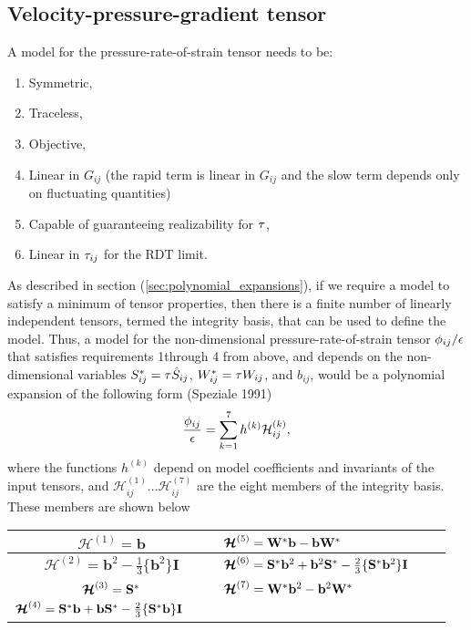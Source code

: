 \documentclass[oneside,a4paper,11pt]{report}
\begin{document}
\subsection{Velocity-pressure-gradient tensor}

A model for the pressure-rate-of-strain tensor needs to be:
\begin{enumerate}
\item Symmetric,
\item Traceless,
\item Objective,
\item Linear in $G_{ij}$ (the rapid term is linear in $G_{ij}$ and the slow term depends only on fluctuating quantities)
\item Capable of guaranteeing realizability for $\tau$,
\item Linear in $\tau_{ij}$ for the RDT limit.
\end{enumerate}
As described in section (\ref{sec:polynomial_expansions}), if we require a model to satisfy a minimum of tensor properties, then there is a finite number of linearly independent tensors, termed the integrity basis, that can be used to define the model. Thus, a model for the non-dimensional pressure-rate-of-strain tensor $\phi_{ij}/\epsilon$ that satisfies requirements 1through 4 from above, and depends on the non-dimensional variables $S^*_{ij} = \tau \hat{S}_{ij}$, $W^*_{ij} = \tau W_{ij}$, and $b_{ij}$, would be a polynomial expansion of the following form (Speziale 1991)
\begin{equation}
\frac{\phi_{ij}}{\epsilon} = \sum_{k=1}^7 h^{(k)} \mathcal{H}^{(k)}_{ij},
\end{equation}
where the functions $h^{(k)}$ depend on model coefficients and invariants of the input tensors, and $\mathcal{H}^{(1)}_{ij} ... \mathcal{H}^{(7)}_{ij}$ are the eight members of the integrity basis. These members are shown below
\begin{center}
\begin{tabular} {| Sl | Sl | }
\hline
$\boldsymbol{\mathcal{H}}^{(1)} = \mathbf{b}$ & $\boldsymbol{\mathcal{H}}^{(5)} = \mathbf{W^*} \mathbf{b} - \mathbf{b} \mathbf{W^*}$ \\
\hline
$\boldsymbol{\mathcal{H}}^{(2)} = \mathbf{b}^2 - \frac{1}{3} \{ \mathbf{b}^2 \} \mathbf{I}$ & $\boldsymbol{\mathcal{H}}^{(6)} = \mathbf{S^*} \mathbf{b}^2 + \mathbf{b}^2 \mathbf{S^*} - \frac{2}{3} \{ \mathbf{S^*} \mathbf{b}^2 \} \mathbf{I}$ \\
\hline
$\boldsymbol{\mathcal{H}}^{(3)} = \mathbf{S^*} $ & $ \boldsymbol{\mathcal{H}}^{(7)} = \mathbf{W^*} \mathbf{b}^2 - \mathbf{b}^2 \mathbf{W^*} $ \\
\hline
$ \boldsymbol{\mathcal{H}}^{(4)} = \mathbf{S^*} \mathbf{b} + \mathbf{b} \mathbf{S^*} - \frac{2}{3} \{ \mathbf{S^*} \mathbf{b} \} \mathbf{I}  \qquad$ & \\
\hline
\end{tabular}
\end{center}
\end{document}
